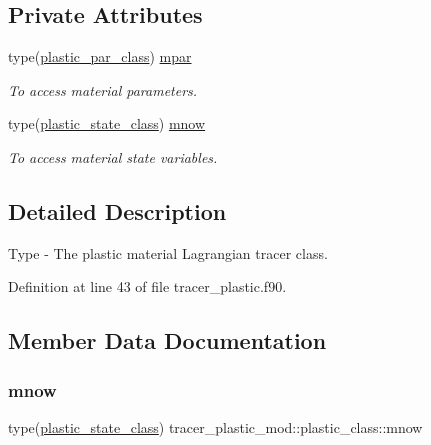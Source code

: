 \subsection*{Private Attributes}
\begin{DoxyCompactItemize}
\item 
type(\mbox{\hyperlink{structtracer__plastic__mod_1_1plastic__par__class}{plastic\+\_\+par\+\_\+class}}) \mbox{\hyperlink{structtracer__plastic__mod_1_1plastic__class_ae1a94a8bd2796aa13dfa820845f56563}{mpar}}
\begin{DoxyCompactList}\small\item\em To access material parameters. \end{DoxyCompactList}\item 
type(\mbox{\hyperlink{structtracer__plastic__mod_1_1plastic__state__class}{plastic\+\_\+state\+\_\+class}}) \mbox{\hyperlink{structtracer__plastic__mod_1_1plastic__class_ae30b971a131c8203026a7631dff3a51f}{mnow}}
\begin{DoxyCompactList}\small\item\em To access material state variables. \end{DoxyCompactList}\end{DoxyCompactItemize}


\subsection{Detailed Description}
Type -\/ The plastic material Lagrangian tracer class. 

Definition at line 43 of file tracer\+\_\+plastic.\+f90.



\subsection{Member Data Documentation}
\mbox{\label{structtracer__plastic__mod_1_1plastic__class_ae30b971a131c8203026a7631dff3a51f}} 
\subsubsection{\texorpdfstring{mnow}{mnow}}
{\footnotesize\ttfamily type(\mbox{\hyperlink{structtracer__plastic__mod_1_1plastic__state__class}{plastic\+\_\+state\+\_\+class}}) tracer\+\_\+plastic\+\_\+mod\+::plastic\+\_\+class\+::mnow\hspace{0.3cm}{\ttfamily [private]}}



